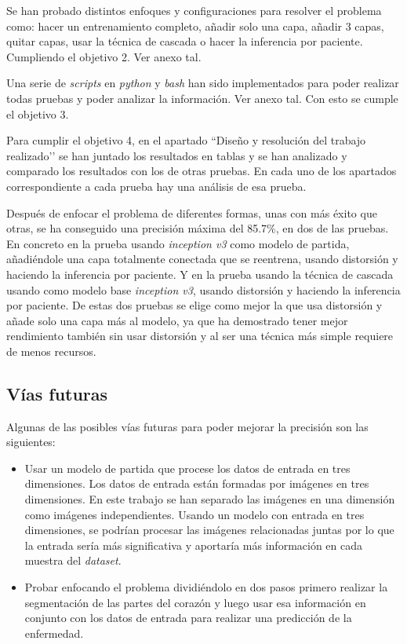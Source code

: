 \documentclass[12pt,a4paper]{article}
\begin{document}
Se han probado distintos enfoques y configuraciones para resolver el problema como: hacer un entrenamiento completo, añadir solo una capa, añadir 3 capas, quitar capas, usar la técnica de cascada o hacer la inferencia por paciente. Cumpliendo el objetivo 2. Ver anexo tal.
\bigskip

Una serie de \textit{scripts} en \textit{python} y \textit{bash} han sido implementados para poder realizar todas pruebas y poder analizar la información. Ver anexo tal. Con esto se cumple el objetivo 3.
\bigskip

Para cumplir el objetivo 4, en el apartado ``Diseño y resolución del trabajo realizado’’ se han juntado los resultados en tablas y se han analizado y comparado los resultados con los de otras pruebas. En cada uno de los apartados correspondiente a cada prueba hay una análisis de esa prueba.
\bigskip

Después de enfocar el problema de diferentes formas, unas con más éxito que otras, se ha conseguido una precisión máxima del 85.7\%, en dos de las pruebas. En concreto en la prueba usando \textit{inception v3} como modelo de partida, añadiéndole una capa totalmente conectada que se reentrena, usando distorsión y haciendo la inferencia por paciente. Y en la prueba usando la técnica de cascada usando como modelo base \textit{inception v3}, usando distorsión y haciendo la inferencia por paciente. De estas dos pruebas se elige como mejor la que usa distorsión y añade solo una capa más al modelo, ya que ha demostrado tener mejor rendimiento también sin usar distorsión y al ser una técnica más simple requiere de menos recursos.

\subsection{Vías futuras}
Algunas de las posibles vías futuras para poder mejorar la precisión son las siguientes:

\begin{itemize}
\item Usar un modelo de partida que procese los datos de entrada en tres dimensiones. Los datos de entrada están formadas por imágenes en tres dimensiones. En este trabajo se han separado las imágenes en una dimensión como imágenes independientes. Usando un modelo con entrada en tres dimensiones, se podrían procesar las imágenes relacionadas juntas por lo que la entrada sería más significativa y aportaría más información en cada muestra del \textit{dataset}.

\item Probar enfocando el problema dividiéndolo en dos pasos primero realizar la segmentación de las partes del corazón y luego usar esa información en conjunto con los datos de entrada para realizar una predicción de la enfermedad.
\end{itemize}
\end{document}
